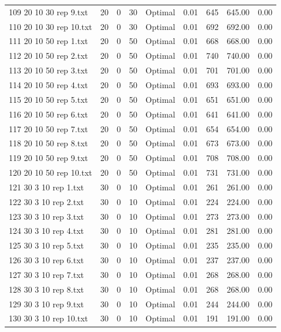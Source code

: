 \begin{longtable}{lrrllrrrr}
109 20 10 30 rep 9.txt & 20 & 0 & 30 & Optimal &  0.01 & 645 & 645.00 &  0.00\\
110 20 10 30 rep 10.txt & 20 & 0 & 30 & Optimal &  0.01 & 692 & 692.00 &  0.00\\
111 20 10 50 rep 1.txt & 20 & 0 & 50 & Optimal &  0.01 & 668 & 668.00 &  0.00\\
112 20 10 50 rep 2.txt & 20 & 0 & 50 & Optimal &  0.01 & 740 & 740.00 &  0.00\\
113 20 10 50 rep 3.txt & 20 & 0 & 50 & Optimal &  0.01 & 701 & 701.00 &  0.00\\
114 20 10 50 rep 4.txt & 20 & 0 & 50 & Optimal &  0.01 & 693 & 693.00 &  0.00\\
115 20 10 50 rep 5.txt & 20 & 0 & 50 & Optimal &  0.01 & 651 & 651.00 &  0.00\\
116 20 10 50 rep 6.txt & 20 & 0 & 50 & Optimal &  0.01 & 641 & 641.00 &  0.00\\
117 20 10 50 rep 7.txt & 20 & 0 & 50 & Optimal &  0.01 & 654 & 654.00 &  0.00\\
118 20 10 50 rep 8.txt & 20 & 0 & 50 & Optimal &  0.01 & 673 & 673.00 &  0.00\\
119 20 10 50 rep 9.txt & 20 & 0 & 50 & Optimal &  0.01 & 708 & 708.00 &  0.00\\
120 20 10 50 rep 10.txt & 20 & 0 & 50 & Optimal &  0.01 & 731 & 731.00 &  0.00\\
121 30 3 10 rep 1.txt & 30 & 0 & 10 & Optimal &  0.01 & 261 & 261.00 &  0.00\\
122 30 3 10 rep 2.txt & 30 & 0 & 10 & Optimal &  0.01 & 224 & 224.00 &  0.00\\
123 30 3 10 rep 3.txt & 30 & 0 & 10 & Optimal &  0.01 & 273 & 273.00 &  0.00\\
124 30 3 10 rep 4.txt & 30 & 0 & 10 & Optimal &  0.01 & 281 & 281.00 &  0.00\\
125 30 3 10 rep 5.txt & 30 & 0 & 10 & Optimal &  0.01 & 235 & 235.00 &  0.00\\
126 30 3 10 rep 6.txt & 30 & 0 & 10 & Optimal &  0.01 & 237 & 237.00 &  0.00\\
127 30 3 10 rep 7.txt & 30 & 0 & 10 & Optimal &  0.01 & 268 & 268.00 &  0.00\\
128 30 3 10 rep 8.txt & 30 & 0 & 10 & Optimal &  0.01 & 268 & 268.00 &  0.00\\
129 30 3 10 rep 9.txt & 30 & 0 & 10 & Optimal &  0.01 & 244 & 244.00 &  0.00\\
130 30 3 10 rep 10.txt & 30 & 0 & 10 & Optimal &  0.01 & 191 & 191.00 &  0.00\\

\end{longtable}
